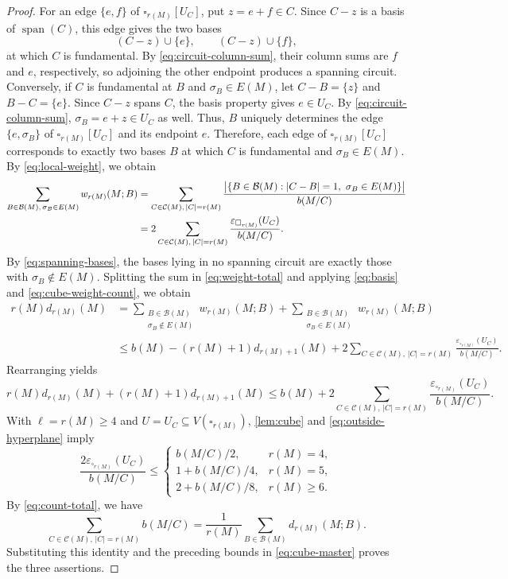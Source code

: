 \documentclass[10pt,a4paper]{article}
\numberwithin{equation}{section}
\DeclareMathOperator{\spanof}{span}
\newcommand{\BB}{\mathcal B}
\newcommand{\CC}{\mathcal C}
\newcommand{\wloc}[1]{w_{#1}(M;B)}
\newcommand{\dloc}[1]{d_{#1}(M;B)}
\begin{document}
\begin{proof}
For an edge \(\{e,f\}\) of \(\square_{r(M)}[U_C]\), put
\(z=e+f\in C\). Since \(C-z\) is a basis of \(\spanof(C)\), this edge gives the two bases
\[
 (C-z)\cup\{e\},\qquad (C-z)\cup\{f\},
\]
at which \(C\) is fundamental. By \eqref{eq:circuit-column-sum},
their column sums are \(f\) and \(e\), respectively, so adjoining
the other endpoint produces a spanning circuit.
Conversely, if \(C\) is fundamental at
\(B\) and \(\sigma_B\in E(M)\), let
\(C-B=\{z\}\) and \(B-C=\{e\}\).
Since \(C-z\) spans \(C\), the basis property gives \(e\in U_C\).
By \eqref{eq:circuit-column-sum}, \(\sigma_B=e+z\in U_C\) as well.
Thus, \(B\) uniquely determines the edge \(\{e,\sigma_B\}\) of
\(\square_{r(M)}[U_C]\) and its endpoint \(e\).
Therefore, each edge of \(\square_{r(M)}[U_C]\) corresponds to exactly
two bases \(B\) at which \(C\) is fundamental and \(\sigma_B\in E(M)\).
By \eqref{eq:local-weight}, we obtain
\begin{align}
 \sum_{B\in\BB(M),\,\sigma_B\in E(M)}\wloc{r(M)}&=\sum_{C\in\CC(M),\,|C|=r(M)}
 \frac{\bigl|\{B\in\BB(M):|C-B|=1,\ \sigma_B\in E(M)\}\bigr|}{b(M/C)}\notag\\
 &=2\sum_{C\in\CC(M),\,|C|=r(M)}
 \frac{\varepsilon_{\square_{r(M)}}(U_C)}{b(M/C)}.
 \label{eq:cube-weight-count}
\end{align}
By \eqref{eq:spanning-bases}, the bases lying in no spanning circuit
are exactly those with \(\sigma_B\notin E(M)\).
Splitting the sum in \eqref{eq:weight-total} and applying
\eqref{eq:basis} and \eqref{eq:cube-weight-count}, we obtain
\begin{align*}
 r(M)d_{r(M)}(M)
 &=\sum_{\substack{B\in\BB(M)\\\sigma_B\notin E(M)}}\wloc{r(M)}
 +\sum_{\substack{B\in\BB(M)\\\sigma_B\in E(M)}}\wloc{r(M)}\\
 &\le b(M)-(r(M)+1)d_{r(M)+1}(M)+2\sum_{C\in\CC(M),\,|C|=r(M)}
 \frac{\varepsilon_{\square_{r(M)}}(U_C)}{b(M/C)}.
\end{align*}
Rearranging yields
\begin{equation}\label{eq:cube-master}
 r(M)d_{r(M)}(M)+(r(M)+1)d_{r(M)+1}(M)
 \le b(M)+2\sum_{C\in\CC(M),\,|C|=r(M)}
 \frac{\varepsilon_{\square_{r(M)}}(U_C)}{b(M/C)}.
\end{equation}
With \(\ell=r(M)\ge4\) and \(U=U_C\subseteq V(\square_{r(M)})\),
\autoref{lem:cube} and \eqref{eq:outside-hyperplane} imply
\[
 \frac{2\varepsilon_{\square_{r(M)}}(U_C)}{b(M/C)}
 \le\begin{cases}
 b(M/C)/2,&r(M)=4,\\
 1+b(M/C)/4,&r(M)=5,\\
 2+b(M/C)/8,&r(M)\ge6.
 \end{cases}
\]
By \eqref{eq:count-total}, we have
\[
 \sum_{C\in\CC(M),\,|C|=r(M)}b(M/C)
 =\frac1{r(M)}\sum_{B\in\BB(M)}\dloc{r(M)}.
\]
Substituting this identity and the preceding bounds in
\eqref{eq:cube-master} proves the three assertions.
\end{proof}
\end{document}
